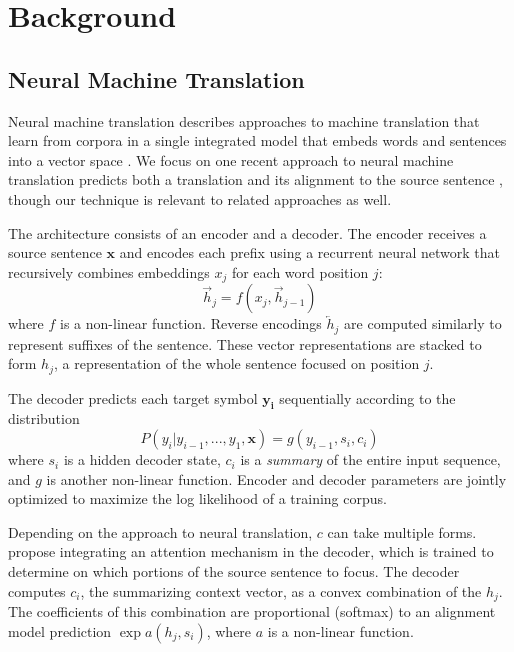 \section{Background}
\label{sec:background}

\subsection{Neural Machine Translation}
Neural machine translation describes approaches to machine translation that
learn from corpora in a single integrated model that embeds words and sentences
into a vector space
. We focus on one
recent approach to neural machine translation predicts both a translation and
its alignment to the source sentence ,
though our technique is relevant to related approaches as well.

The architecture consists of an encoder and a decoder. The encoder receives a
source sentence $\mathbf{x}$ and encodes each prefix using a recurrent neural
network that recursively combines embeddings $x_j$ for each word position $j$:
\begin{equation}
\overrightarrow{h}_{j} = f(x_{j}, \overrightarrow{h}_{j-1})
\end{equation}
where $f$ is a non-linear function. Reverse encodings $\overleftarrow{h}_j$ are
computed similarly to represent suffixes of the sentence. These vector
representations are stacked to form $h_j$, a representation of the whole
sentence focused on position $j$.

The decoder predicts each target symbol $\mathbf{y_i}$ sequentially according
to the distribution
\begin{equation}
P(y_{i} | y_{i-1}, ..., y_{1}, \mathbf{x}) = g(y_{i-1}, s_i, c_i)
\label{eqn:normalize}
\end{equation}
where $s_i$ is a hidden decoder state, $c_i$ is a \emph{summary} of the entire
input sequence, and $g$ is another non-linear function. Encoder and decoder
parameters are jointly optimized to maximize the log likelihood of a training
corpus.

Depending on the approach to neural translation, $c$ can take multiple forms.
 propose integrating an attention mechanism
in the decoder, which is trained to determine on which portions of the source
sentence to focus. The decoder computes $c_{i}$, the summarizing context
vector, as a convex combination of the $h_{j}$. The coefficients of this
combination are proportional (softmax) to an alignment model prediction $\exp a(h_j,
s_i)$, where $a$ is a non-linear function.

